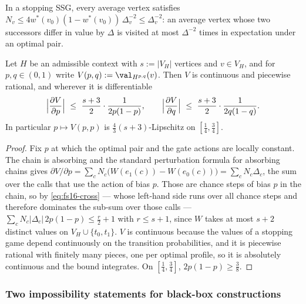 \begin{corollary}\label{cor:fs16-visits}
In a stopping SSG, every average vertex satisfies
$N_v\le 4w^\ast(v_0)(1-w^\ast(v_0))\,\Delta_v^{-2}\le\Delta_v^{-2}$: an average
vertex whose two successors differ in value by $\Delta$ is visited at most
$\Delta^{-2}$ times in expectation under an optimal pair.
\end{corollary}

\begin{corollary}\label{cor:fs16-lip}
Let $H$ be an admissible context with $s:=|V_H|$ vertices and $v\in V_H$, and
for $p,q\in(0,1)$ write $V(p,q):=\val_{H^{p,q}}(v)$. Then $V$ is continuous and
piecewise rational, and wherever it is differentiable
\[
  \Bigl|\frac{\partial V}{\partial p}\Bigr|\ \le\ \frac{s+3}{2}\cdot\frac1{2p(1-p)},
  \qquad
  \Bigl|\frac{\partial V}{\partial q}\Bigr|\ \le\ \frac{s+3}{2}\cdot\frac1{2q(1-q)} .
\]
In particular $p\mapsto V(p,p)$ is $\tfrac43(s+3)$-Lipschitz on
$[\tfrac14,\tfrac34]$.
\end{corollary}

\begin{proof}
Fix $p$ at which the optimal pair and the gate actions are locally constant.
The chain is absorbing and the standard perturbation formula for absorbing
chains gives $\partial V/\partial p=\sum_{c}N_c\bigl(W(e_1(c))-W(e_0(c))\bigr)
=\sum_c N_c\Delta_c$, the sum over the calls that use the action of bias $p$.
Those are chance steps of bias $p$ in the chain, so by
\eqref{eq:fs16-cross} --- whose left-hand side runs over all chance steps and
therefore dominates the sub-sum over those calls ---
$\sum_cN_c|\Delta_c|\,2p(1-p)\le\tfrac r2+1$ with
$r\le s+1$, since $W$ takes at most $s+2$ distinct values on $V_H\cup\{t_0,t_1\}$.
$V$ is continuous because the values of a stopping game depend continuously on
the transition probabilities, and it is piecewise rational with finitely many
pieces, one per optimal profile, so it is absolutely continuous and the bound
integrates. On $[\tfrac14,\tfrac34]$, $2p(1-p)\ge\tfrac38$.
\end{proof}

\subsubsection*{Two impossibility statements for black-box constructions}

